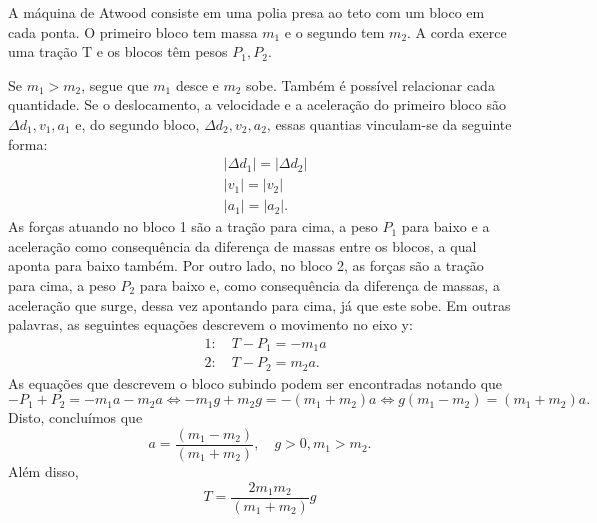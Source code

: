 \documentclass[PhysicsI/physics_notes.tex]{subfiles}
\begin{document}
\begin{example}
	A máquina de Atwood consiste em uma polia presa ao teto com um bloco em cada ponta. O primeiro bloco tem massa
	$m_{1}$ e o segundo tem $m_{2}$. A corda exerce uma tração T e os blocos têm pesos $P_{1}, P_{2}.$

	Se $m_{1}>m_{2}$, segue que $m_{1}$ desce e $m_{2}$ sobe. Também é possível relacionar cada quantidade.
	Se o deslocamento, a velocidade e a aceleração do primeiro bloco são $\Delta d_{1}, v_{1}, a_{1}$ e, do segundo bloco,
	$\Delta d_{2}, v_{2}, a_{2}$, essas quantias vinculam-se da seguinte forma:
	\begin{align*}
		 & |\Delta d_{1}| = |\Delta d_{2}| \\
		 & |v_{1}| = |v_{2}|               \\
		 & |a_{1}| = |a_{2}|.
	\end{align*}
	As forças atuando no bloco 1 são a tração para cima, a peso $P_{1}$ para baixo e a aceleração como consequência da
	diferença de massas entre os blocos, a qual aponta para baixo também. Por outro lado, no bloco 2, as forças são
	a tração para cima, a peso $P_{2}$ para baixo e, como consequência da diferença de massas, a aceleração que surge,
	dessa vez apontando para cima, já que este sobe. Em outras palavras, as seguintes equações descrevem o movimento no
	eixo y:
	\begin{align*}
		 & 1:\quad T-P_{1} = -m_{1}a \\
		 & 2:\quad T-P_{2} = m_{2}a.
	\end{align*}
	As equações que descrevem o bloco subindo podem ser encontradas notando que $-P_{1}+P_{2}=-m_{1}a-m_{2}a \Longleftrightarrow
		-m_{1}g + m_{2}g = -(m_{1}+m_{2})a \Longleftrightarrow  g(m_{1}-m_{2}) = (m_{1}+m_{2})a.$ Disto, concluímos que
	$$
		a = \frac{(m_{1}-m_{2})}{(m_{1}+m_{2})},\quad g>0, m_{1}>m_{2}.
	$$
	Além disso,
	$$
		T = \frac{2m_{1}m_{2}}{(m_{1}+m_{2})}g
	$$
\end{example}
\end{document}
